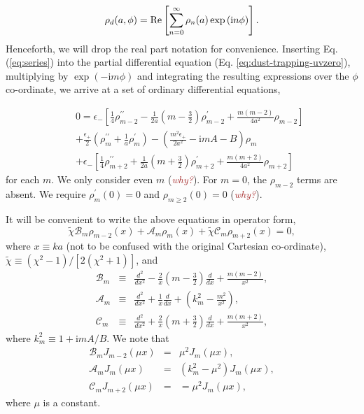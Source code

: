\documentclass[apj]{emulateapj}
\def\brown#1{\textcolor{brown}{#1}}
\newcommand{\comm}[1]{({\it \brown{#1}})}
\newcommand{\Eq}[1]{Eq. (\ref{#1})}
\newcommand{\eq}[1]{\Eq{#1}}
\newcommand{\eqp}[1]{(Eq. \ref{#1})}
\newcommand{\beq}{\begin{equation}}
\newcommand{\eeq}{\end{equation}}
\newcommand{\beqn}{\begin{eqnarray}}
\newcommand{\eeqn}{\end{eqnarray}}
\begin{document}
\beq\label{eq:series}
\rho_d(a,\phi) = {\rm Re}
\left[\sum_{n=0}^\infty\rho_n(a)\exp{\left(\mathrm{i}n\phi\right)} \right].
\eeq
Henceforth, we will drop the real part notation for convenience. Inserting
\eq{eq:series} into the partial differential equation \eqp{eq:dust-trapping-uvzero},
multiplying by $\exp{(-\mathrm{i}m\phi)}$ and integrating the resulting
expressions over the $\phi$ co-ordinate, we arrive at a set of
ordinary differential equations,

\beqn\label{eq:ode1}
&&0=\epsilon_{-}\left[\frac{1}{4}\rho_{m-2}^{\prime\prime}
-\frac{1}{2a}\left(m-\frac{3}{2}\right)\rho_{m-2}^\prime +
\frac{m(m-2)}{4a^2}\rho_{m-2}\right] \nonumber\\
&&+\frac{\epsilon_+}{2}\left(\rho_m^{\prime\prime}+\frac{1}{a}\rho_m^\prime\right)
-\left(\frac{m^2\epsilon_+}{2a^2}-\mathrm{i}mA-B\right)\rho_m\nonumber\\
&&+\epsilon_{-}\left[\frac{1}{4}\rho_{m+2}^{\prime\prime}
+\frac{1}{2a}\left(m+\frac{3}{2}\right)\rho_{m+2}^\prime +
\frac{m(m+2)}{4a^2}\rho_{m+2} \right]
\eeqn
for each $m$. We only consider even $m$ \comm{why?}. For $m=0$, the $\rho_{m-2}$
terms are absent. We require $\rho_m^\prime(0)=0$ and
$\rho_{m\geq2}(0)=0$ \comm{why?}. 

It will be convenient to write the above equations
in operator form,
\beq\label{eq:ode2}
\tilde{\chi}\mathcal{B}_m\rho_{m-2}(x) + \mathcal{A}_m\rho_m(x) + \tilde{\chi}\mathcal{C}_m\rho_{m+2}(x)=0,
\eeq
where $x\equiv ka$ (not to be confused with the original Cartesian
co-ordinate), $\tilde{\chi}\equiv(\chi^2-1)/[2(\chi^2+1)]$, and 
\beqn\label{eq:ops}
\mathcal{B}_m &\equiv& \frac{d^2}{dx^2} -
\frac{2}{x}\left(m-\frac{3}{2}\right)\frac{d}{dx} + \frac{m(m-2)}{x^2},\\
\mathcal{A}_m &\equiv& \frac{d^2}{dx^2} + \frac{1}{x}\frac{d}{dx} +
\left(k_m^2 - \frac{m^2}{x^2}\right),\\
\mathcal{C}_m  &\equiv& \frac{d^2}{dx^2} +
\frac{2}{x}\left(m+\frac{3}{2}\right)\frac{d}{dx} +
\frac{m(m+2)}{x^2}, 
\eeqn
where $k_m^2 \equiv 1+\mathrm{i}mA/B$. We note that
\beqn\label{eq:ops2}
\mathcal{B}_mJ_{m-2}(\mu x) &=& \mu^2J_m(\mu x),\\
\mathcal{A}_mJ_m(\mu x) &=& \left(k_m^2 - \mu^2\right)J_m(\mu x),\\
\mathcal{C}_mJ_{m+2}(\mu x) &= & = \mu^2J_m(\mu x),
\eeqn
where $\mu$ is a constant. 
\end{document}
